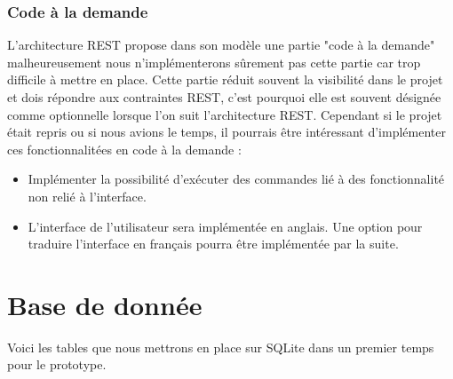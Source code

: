 

\subsubsection{Code à la demande}
L'architecture REST propose dans son modèle une partie "code à la demande" malheureusement nous n'implémenterons sûrement pas cette partie car trop difficile à mettre en place. Cette partie réduit souvent la visibilité dans le projet et dois répondre aux contraintes REST, c'est pourquoi elle est souvent désignée comme optionnelle lorsque l'on suit l'architecture REST. Cependant si le projet était repris ou si nous avions le temps, il pourrais être intéressant d'implémenter ces fonctionnalitées en code à la demande :
\begin{itemize}
    \item Implémenter la possibilité d'exécuter des commandes lié à des fonctionnalité non relié à l'interface.
    \item L'interface de l'utilisateur sera implémentée en anglais. Une option pour traduire l'interface en français pourra être implémentée par la suite.
\end{itemize}

\section{Base de donnée}

Voici les tables que nous mettrons en place sur SQLite dans un premier temps pour le prototype.

\vspace{2em}

